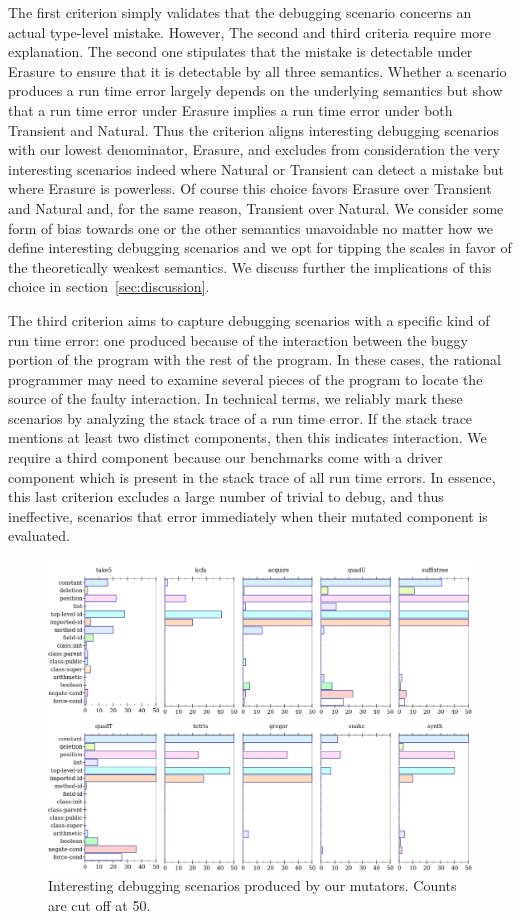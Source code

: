 The first criterion simply validates that the debugging scenario concerns
an actual type-level mistake. However, The second and third criteria require 
more explanation.  The second one stipulates that the mistake is
detectable under Erasure to ensure that it is detectable by all three
semantics.   Whether a scenario produces a run time error largely depends on 
the underlying semantics but \citet{gfd-oopsla-2019}
show that a run time error under Erasure implies a run time
error under both Transient and Natural. Thus the criterion aligns
interesting debugging scenarios with our lowest denominator, Erasure, 
and excludes  from consideration the very interesting scenarios indeed where Natural or
Transient can detect a mistake but where Erasure is powerless. Of course this choice favors
Erasure over Transient and Natural and, for the same reason, Transient over
Natural. We consider some form of bias towards one or the other semantics
unavoidable no matter how we define interesting debugging scenarios and we
opt for tipping the scales in favor of the theoretically weakest
semantics. We discuss further the implications of this choice in
section~\ref{sec:discussion}.

The third criterion aims to capture debugging scenarios with a specific
kind of run time error: one produced because of the interaction between the buggy
portion of the program with the rest of the program.  In these cases, the rational programmer
may need to examine several pieces of the program to locate the source of the faulty interaction.
In technical terms, we reliably mark these scenarios by
analyzing the stack trace of a run time error.  If the stack trace mentions at
least two distinct components, then this indicates interaction.  We require a third component because our benchmarks come
with a driver component which is present in the stack trace of all run
time errors. In essence, this last criterion excludes a large number of
trivial to debug, and thus ineffective, scenarios that error immediately when their mutated component is
evaluated. 


\begin{figure}
  \centering
  \includegraphics[scale=0.35]{./plots/mutant-breakdown}
  \caption{Interesting debugging scenarios produced by our mutators. Counts are cut off at 50.}
  \label{fig:mutant-breakdown}
\end{figure}


